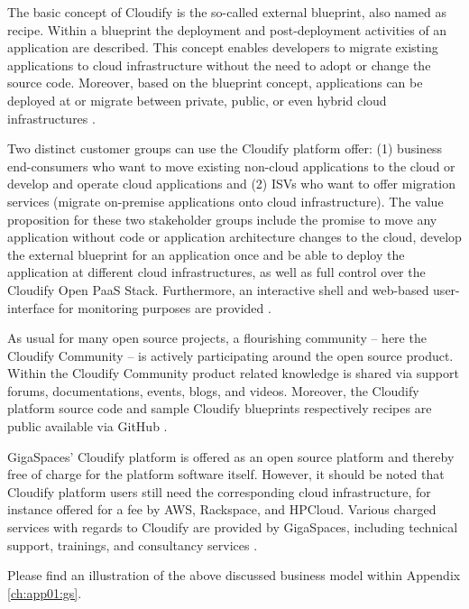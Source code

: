 The basic concept of Cloudify is the so-called external blueprint, also named as recipe. Within a blueprint the deployment and post-deployment activities of an application are described. This concept enables developers to migrate existing applications to cloud infrastructure without the need to adopt or change the source code. Moreover, based on the blueprint concept, applications can be deployed at or migrate between private, public, or even hybrid cloud infrastructures \citep{GigaSpaces2013a}.

Two distinct customer groups can use the Cloudify platform offer: (1) business end-consumers who want to move existing non-cloud applications to the cloud or develop and operate cloud applications and (2) \acp{ISV} who want to offer migration services (migrate on-premise applications onto cloud infrastructure). The value proposition for these two stakeholder groups include the promise to move any application without code or application architecture changes to the cloud, develop the external blueprint for an application once and be able to deploy the application at different cloud infrastructures, as well as full control over the Cloudify Open \ac{PaaS} Stack. Furthermore, an interactive shell and web-based user-interface for monitoring purposes are provided \citep{GigaSpaces2013a}.

As usual for many open source projects, a flourishing community -- here the Cloudify Community -- is actively participating around the open source product. Within the Cloudify Community product related knowledge is shared via support forums, documentations, events, blogs, and videos. Moreover, the Cloudify platform source code and sample Cloudify blueprints respectively recipes are public available via GitHub \citep{GigaSpaces2013b,GitHub2013,GitHub2013a}.

GigaSpaces' Cloudify platform is offered as an open source platform and thereby free of charge for the platform software itself. However, it should be noted that Cloudify platform users still need the corresponding cloud infrastructure, for instance offered for a fee by \ac{AWS}, Rackspace, and HPCloud. Various charged services with regards to Cloudify are provided by GigaSpaces, including technical support, trainings, and consultancy services \citep{GigaSpaces2013a}.

Please find an illustration of the above discussed business model within Appendix \ref{ch:app01:gs}.

%

